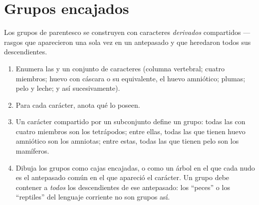 \section{Grupos encajados}

\begin{method}\label{met:g10:common-ancestry:grouping}
Los grupos de parentesco se construyen con caracteres
\emph{derivados} compartidos --- rasgos que aparecieron una sola vez en
un antepasado y que heredaron todos sus descendientes.
\begin{enumerate}
  \item Enumera las  y un conjunto de caracteres (columna
        vertebral; cuatro miembros; huevo con cáscara o su
        equivalente, el huevo amniótico; plumas; pelo y leche; y así
        sucesivamente).
  \item Para cada carácter, anota qué  lo poseen.
  \item Un carácter compartido por un subconjunto define un grupo:
        todas las  con cuatro miembros son los tetrápodos;
        entre ellas, todas las que tienen huevo amniótico son los
        amniotas; entre estas, todas las que tienen pelo son los
        mamíferos.
  \item Dibuja los grupos como cajas encajadas, o como un árbol en el
        que cada nudo es el antepasado común en el que apareció el
        carácter. Un grupo debe contener a \emph{todos} los
        descendientes de ese antepasado: los ``peces'' o los
        ``reptiles'' del lenguaje corriente no son grupos así.
\end{enumerate}
\end{method}

